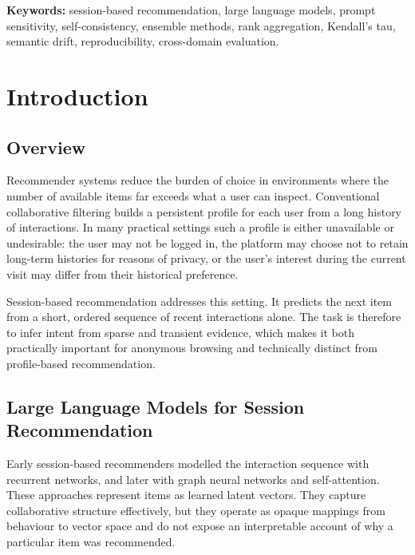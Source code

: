 \documentclass[12pt,a4paper,oneside]{report}
\begin{document}
\vspace{6pt}
\noindent\textbf{Keywords:} session-based recommendation, large language models,
prompt sensitivity, self-consistency, ensemble methods, rank aggregation,
Kendall's tau, semantic drift, reproducibility, cross-domain evaluation.

\clearpage

\renewcommand{\contentsname}{TABLE OF CONTENTS}
\tableofcontents
\clearpage

\renewcommand{\listtablename}{LIST OF TABLES}
\listoftables
\clearpage

\setcounter{page}{1}

\chapter{Introduction}

\section{Overview}

Recommender systems reduce the burden of choice in environments where the number
of available items far exceeds what a user can inspect. Conventional
collaborative filtering builds a persistent profile for each user from a long
history of interactions. In many practical settings such a profile is either
unavailable or undesirable: the user may not be logged in, the platform may
choose not to retain long-term histories for reasons of privacy, or the user's
interest during the current visit may differ from their historical preference.

Session-based recommendation addresses this setting. It predicts the next item
from a short, ordered sequence of recent interactions alone. The task is
therefore to infer intent from sparse and transient evidence, which makes it
both practically important for anonymous browsing and technically distinct from
profile-based recommendation.

\section{Large Language Models for Session Recommendation}

Early session-based recommenders modelled the interaction sequence with
recurrent networks, and later with graph neural networks and self-attention.
These approaches represent items as learned latent vectors. They capture
collaborative structure effectively, but they operate as opaque mappings from
behaviour to vector space and do not expose an interpretable account of why a
particular item was recommended.
\end{document}
